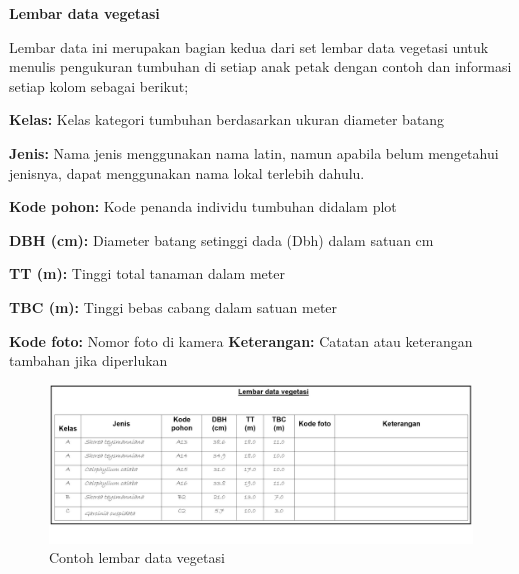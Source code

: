 \documentclass[
]{book}
\begin{document}
\textbf{Lembar data vegetasi}

Lembar data ini merupakan bagian kedua dari set lembar data vegetasi untuk menulis pengukuran tumbuhan di setiap anak petak dengan contoh dan informasi setiap kolom sebagai berikut;

\textbf{Kelas:} Kelas kategori tumbuhan berdasarkan ukuran diameter batang

\textbf{Jenis:} Nama jenis menggunakan nama latin, namun apabila belum mengetahui jenisnya, dapat menggunakan nama lokal terlebih dahulu.

\textbf{Kode pohon:} Kode penanda individu tumbuhan didalam plot

\textbf{DBH (cm):} Diameter batang setinggi dada (Dbh) dalam satuan cm

\textbf{TT (m):} Tinggi total tanaman dalam meter

\textbf{TBC (m):} Tinggi bebas cabang dalam satuan meter

\textbf{Kode foto:} Nomor foto di kamera
\textbf{Keterangan:} Catatan atau keterangan tambahan jika diperlukan

\begin{figure}

{\centering \includegraphics[width=1\linewidth]{images/ldv_m} 

}

\caption{Contoh lembar data vegetasi}\label{fig:ldvm}
\end{figure}
\end{document}
